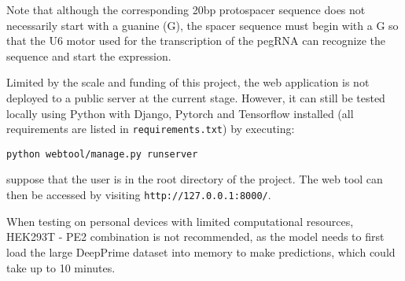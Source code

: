 Note that although the corresponding 20bp protospacer sequence does not necessarily start with a guanine (G), the spacer sequence must begin with a G so that the U6 motor used for the transcription of the pegRNA can recognize the sequence and start the expression\cite{hsieh-fengEfficientExpressionMultiple2020}. 

Limited by the scale and funding of this project, the web application is not deployed to a public server at the current stage. However, it can still be tested locally using Python with Django, Pytorch and Tensorflow installed (all requirements are listed in \verb|requirements.txt|) by executing:

\verb|python webtool/manage.py runserver|

suppose that the user is in the root directory of the project. The web tool can then be accessed by visiting \verb|http://127.0.0.1:8000/|. 

When testing on personal devices with limited computational resources, HEK293T - PE2 combination is not recommended, as the model needs to first load the large DeepPrime dataset into memory to make predictions, which could take up to 10 minutes.